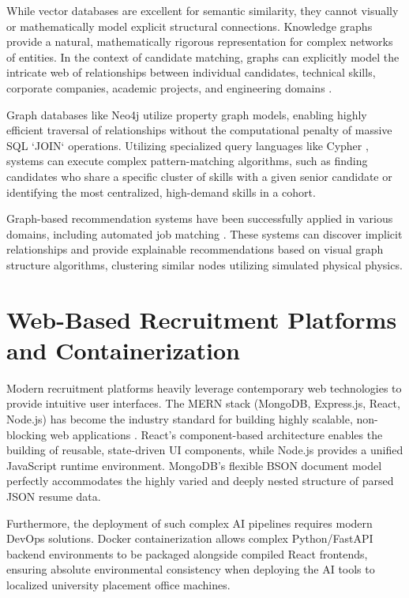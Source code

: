 \documentclass[12pt,a4paper]{report}
\begin{document}
While vector databases are excellent for semantic similarity, they cannot visually or mathematically model explicit structural connections. Knowledge graphs provide a natural, mathematically rigorous representation for complex networks of entities. In the context of candidate matching, graphs can explicitly model the intricate web of relationships between individual candidates, technical skills, corporate companies, academic projects, and engineering domains \cite{kg-applications}.

Graph databases like Neo4j utilize property graph models, enabling highly efficient traversal of relationships without the computational penalty of massive SQL `JOIN` operations. Utilizing specialized query languages like Cypher \cite{neo4j-guide}, systems can execute complex pattern-matching algorithms, such as finding candidates who share a specific cluster of skills with a given senior candidate or identifying the most centralized, high-demand skills in a cohort.

Graph-based recommendation systems have been successfully applied in various domains, including automated job matching \cite{kg-recommendation}. These systems can discover implicit relationships and provide explainable recommendations based on visual graph structure algorithms, clustering similar nodes utilizing simulated physical physics.

\section{Web-Based Recruitment Platforms and Containerization}

Modern recruitment platforms heavily leverage contemporary web technologies to provide intuitive user interfaces. The MERN stack (MongoDB, Express.js, React, Node.js) has become the industry standard for building highly scalable, non-blocking web applications \cite{mern-stack}. React's component-based architecture enables the building of reusable, state-driven UI components, while Node.js provides a unified JavaScript runtime environment. MongoDB's flexible BSON document model perfectly accommodates the highly varied and deeply nested structure of parsed JSON resume data.

Furthermore, the deployment of such complex AI pipelines requires modern DevOps solutions. Docker containerization allows complex Python/FastAPI backend environments to be packaged alongside compiled React frontends, ensuring absolute environmental consistency when deploying the AI tools to localized university placement office machines.
\end{document}
